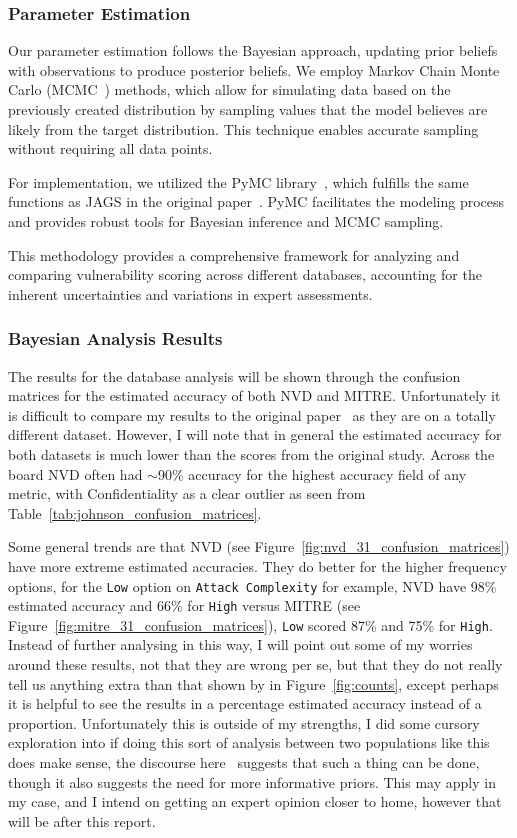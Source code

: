 \documentclass[12pt]{article}
\begin{document}
\subsubsection{Parameter Estimation}

Our parameter estimation follows the Bayesian approach, updating prior beliefs with observations to
produce posterior beliefs. We employ Markov Chain Monte Carlo (MCMC~\cite{mcmc}) methods, which allow for
simulating data based on the previously created distribution by sampling values that the model
believes are likely from the target distribution. This technique enables accurate sampling without
requiring all data points.

For implementation, we utilized the PyMC library~\cite{pymc}, which fulfills the same functions as
JAGS in the original paper~\cite{bayes}. PyMC facilitates the modeling process and provides robust
tools for Bayesian inference and MCMC sampling.

This methodology provides a comprehensive framework for analyzing and comparing vulnerability
scoring across different databases, accounting for the inherent uncertainties and variations in
expert assessments.


\subsubsection{Bayesian Analysis Results}

The results for the database analysis will be shown through the confusion matrices for the estimated
accuracy of both NVD and MITRE. Unfortunately it is difficult to compare my results to the original
paper~\cite{bayes} as they are on a totally different dataset. However, I will note that in general the estimated
accuracy for both datasets is much lower than the scores from the original study. Across the board NVD
often had $\sim$90\% accuracy for the highest accuracy field of any metric, with Confidentiality as
a clear outlier as seen from Table~\ref{tab:johnson_confusion_matrices}.

Some general trends are that NVD (see Figure~\ref{fig:nvd_31_confusion_matrices}) have more extreme
estimated accuracies. They do better for the higher frequency options, for the \texttt{Low} option
on \texttt{Attack Complexity} for example, NVD have 98\% estimated accuracy and 66\% for
\texttt{High} versus MITRE (see Figure~\ref{fig:mitre_31_confusion_matrices}), \texttt{Low} scored
87\% and 75\% for \texttt{High}. Instead of further analysing in this way, I will point out some of
my worries around these results, not that they are wrong per se, but that they do not really tell us
anything extra than that shown by in Figure~\ref{fig:counts}, except perhaps it is helpful to see
the results in a percentage estimated accuracy instead of a proportion. Unfortunately this is
outside of my strengths, I did some cursory exploration into if doing this sort of analysis
between two populations like this does make sense, the discourse here~\cite{stat_modeling} suggests
that such a thing can be done, though it also suggests the need for more informative priors. This
may apply in my case, and I intend on getting an expert opinion closer to home, however that will be
after this report.
\end{document}
